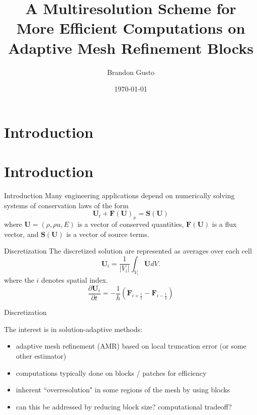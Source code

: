 \documentclass{beamer}
\begin{document}
\section{Introduction}
\title{A Multiresolution Scheme for More Efficient Computations on Adaptive Mesh Refinement Blocks}
\author{Brandon Gusto} %
\date{\today}
\frame{\titlepage}

\section{Introduction}

\begin{frame}{Introduction}
    Many engineering applications depend on numerically solving systems of conservation laws of the form
    \begin{equation*}
        \mathbf{U}_{t} + \mathbf{F}(\mathbf{U})_{x} = \mathbf{S}(\mathbf{U})
    \end{equation*}
    where $\mathbf{U} = (\rho,\rho u,E)$ is a vector of conserved quantities,
    $\mathbf{F}(\mathbf{U})$ is a flux vector, and $\mathbf{S}(\mathbf{U})$ is a
    vector of source terms.
\end{frame}

\begin{frame}{Discretization}
    The discretized solution are represented as averages over each cell
    \begin{equation*}
        \mathbf{U}_{i} = \frac{1}{|V_{i}|} \int_{V_{i}} \mathbf{U} dV.
    \end{equation*}
    where the $i$ denotes spatial index.
    \begin{equation*}
        \frac{\partial \mathbf{U}_{i}}{\partial t} = -\frac{1}{h} \left( \mathbf{F}_{i+\frac{1}{2}}
            - \mathbf{F}_{i-\frac{1}{2}} \right)
    \end{equation*}
\end{frame}

\begin{frame}{Discretization}
\end{frame}

\begin{frame}{}
    The interest is in solution-adaptive methods:
    \begin{itemize}
        \item<2-> adaptive mesh refinement (AMR) based on local truncation error (or some other estimator)
        \item<3-> computations typically done on blocks / patches for efficiency
        \item<4-> inherent ``overresolution" in some regions of the mesh by using blocks
        \item<5-> can this be addressed by reducing block size? computational tradeoff?
    \end{itemize}
\end{frame}
\end{document}
